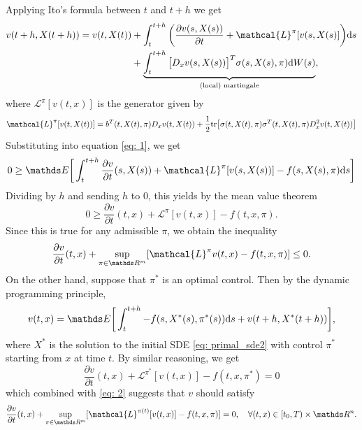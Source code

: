 Applying Ito's formula between $t$ and $t+h$ we get
\begin{align*}
    v(t+h, X(t+h)) = v(t, X(t)) &+ \int_t^{t+h} \bigg( \frac{\partial v(s, X(s))}{\partial t} + \mathcal{L}^\pi [v(s, X(s)] \bigg) \d s\\
    &+ \underbrace{\int_{t}^{t+h} \big[D_x v(s, X(s))\big]^T \sigma(s, X(s), \pi) \d W(s)}_{\text{(local) martingale}},
\end{align*}
where $\mathcal{L}^\pi[v(t,x)]$ is the generator given by
\begin{equation}
    \mathcal{L}^\pi [v(t, X(t))] 
    = b^T(t, X(t), \pi) D_x v(t, X(t)) + \frac12 \tr\big[\sigma(t, X(t), \pi) \sigma^T(t, X(t), \pi) D_x^2 v(t, X(t))\big]
    \label{eq: generator}
\end{equation}
Substituting into equation \eqref{eq: 1}, we get 
\begin{equation*}
    0 \ge \E \bigg[ \int_{t}^{t + h} \frac{\partial v}{\partial t}(s, X(s)) + \mathcal{L}^\pi[v(s, X(s))] - f(s, X(s), \pi) \d s \bigg]
\end{equation*}
Dividing by $h$ and sending $h$ to $0$, this yields by the mean value theorem 
\begin{equation*}
    0 \ge \frac{\partial v}{\partial t}(t, x) + \mathcal{L}^\pi[v(t,x)] - f(t, x, \pi).
\end{equation*}
Since this is true for any admissible $\pi$, we obtain the inequality
\begin{equation}
    \frac{\partial v}{\partial t} (t, x) + \sup_{\pi \in \R^m} [\mathcal{L}^\pi v(t,x) - f(t, x, \pi)] \le 0.
    \label{eq: 2}
\end{equation}
On the other hand, suppose that $\pi^*$ is an optimal control. Then by the dynamic programming principle, 
\begin{equation}
    v(t,x) = \E\bigg[ \int_{t}^{t+h} - f(s, X^*(s), \pi^*(s)) \d s + v(t+h, X^*(t+h)) \bigg],
\end{equation}
where $X^*$ is the solution to the initial SDE \eqref{eq: primal_sde2} with control $\pi^*$ starting from $x$ at time $t$. By similar reasoning, we get 
\begin{equation*}
    \frac{\partial v}{\partial t} (t,x) + \mathcal{L}^{\pi^*} [v(t,x)] - f(t, x, \pi^*) = 0
\end{equation*}
which combined with \eqref{eq: 2} suggests that $v$ should satisfy
\begin{equation}
    \frac{\partial v}{\partial t} (t,x) + \sup_{\pi \in \R^m} [\mathcal{L}^{\pi(t)} [v(t,x)] - f(t, x, \pi)] = 0, \quad \forall (t,x) \in [t_0, T) \times \R^n.
    \label{eq: hjb_inf}
\end{equation}
